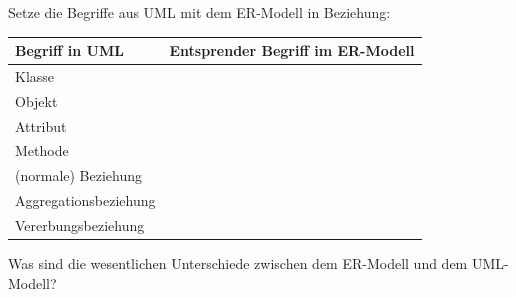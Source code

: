 \begin{compactenum}[a)]
\item Setze die Begriffe aus UML mit dem ER-Modell in Beziehung:

\vspace{2mm}

\bgroup
\def\arraystretch{1.2}
\begin{tabular}{|l|l|}\hline
\textbf{Begriff in UML} & \textbf{Entsprender Begriff im ER-Modell\hspace{2cm}}
\\
\hline Klasse & \\ \hline
Objekt & \\ \hline
Attribut & \\ \hline
Methode & \\ \hline
(normale) Beziehung & \\ \hline
Aggregationsbeziehung & \\ \hline
Vererbungsbeziehung & \\ \hline
\end{tabular}
\egroup

\vspace{2mm}

\item Was sind die wesentlichen Unterschiede zwischen dem ER-Modell und dem
UML-Modell?
\end{compactenum}
